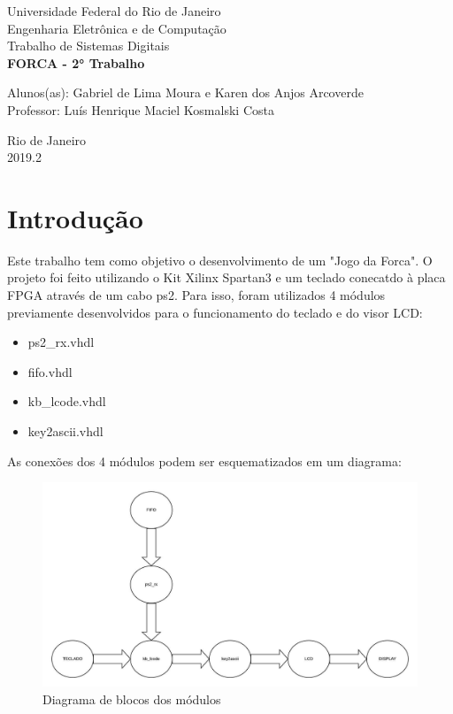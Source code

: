 \documentclass[a4paper,12pt,twoside]{article}
\date{}
\begin{document}
\begin{titlepage}
\begin{center}
{\large Universidade Federal do Rio de Janeiro}\\[0.2cm]
{\large Engenharia Eletrônica e de Computação}\\[0.2cm]
{\large Trabalho de Sistemas Digitais}\\[5.1cm]
{\bf \huge FORCA - 2° Trabalho}\\[5.1cm]
\end{center}
{\large Alunos(as): Gabriel de Lima Moura e Karen dos Anjos Arcoverde}\\[0.7cm]
{\large Professor: Luís Henrique Maciel Kosmalski Costa}\\[5.1cm]
\begin{center}
{\large Rio de Janeiro}\\[0.2cm]
{\large 2019.2}
\end{center}
\end{titlepage}

\renewcommand{\contentsname}{Sumário}

\tableofcontents
\clearpage
\section{Introdução}
Este trabalho tem como objetivo o desenvolvimento de um "Jogo da Forca".
O projeto foi feito utilizando o Kit Xilinx Spartan3 e um teclado conecatdo à placa FPGA através de um cabo ps2. Para isso, foram utilizados 4 módulos previamente desenvolvidos para o funcionamento do teclado e do visor LCD:
 \begin{itemize}
   \item ps2\_rx.vhdl
   \item fifo.vhdl
   \item kb\_lcode.vhdl
   \item key2ascii.vhdl
 \end{itemize}
 
 As conexões dos 4 módulos podem ser esquematizados em um diagrama:
 \begin{figure}[H]
\centering
\includegraphics[scale=0.6]{diagramadeblocos.jpeg}
\caption{Diagrama de blocos dos módulos}
\label{fig:diagrama}
\end{figure}
 
\end{document}
